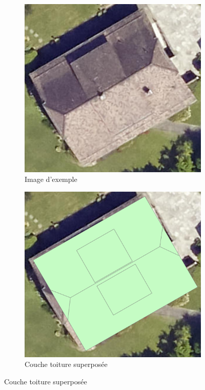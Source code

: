 \begin{figure}[H]
    \centering
    
    \begin{subfigure}[b]{0.475\textwidth}
        \centering
        \includegraphics[width=\textwidth]{02-main/figures/ch3/ch3_piste_exploree_classification_02_image_originale.png}
        \caption{Image d'exemple}
        \label{fig:ch3_piste_exploree_classification_02_image_originale}
    \end{subfigure}
    \hfill
    \begin{subfigure}[b]{0.48\textwidth}
        \centering
        \includegraphics[width=\textwidth]{02-main/figures/ch3/ch3_piste_exploree_classification_03_couche_toiture.png}
        \caption{Couche toiture superposée}
        \label{fig:ch3_piste_exploree_classification_03_couche_toiture}
    \end{subfigure}
    

\end{figure}
